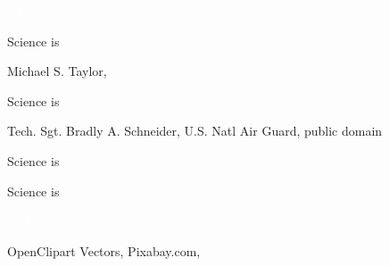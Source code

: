 \documentclass[t]{beamer}
\begin{document}

{
\begin{frame}[b]

	\hfill \tiny\textcolor{white}{J.J, }
\end{frame}
}
%
{
\begin{frame}[b]{Science is }

\tiny Michael S. Taylor, 
\end{frame}
}

{
\begin{frame}[b]{Science is }

\tiny Tech. Sgt. Bradly A. Schneider, U.S. Natl Air Guard, public domain

\end{frame}
}
%

{
	\begin{frame}[b]{Science is }
\end{frame}
}
%

{
\begin{frame}[b]{Science is }
\end{frame}
}
%
{
\begin{frame}[b]

\hfill \tiny \textcolor{white}{decltype, }
\end{frame}
}

{
\begin{frame}[b,plain]

\hfill\tiny OpenClipart Vectors, Pixabay.com, 
\end{frame}
}

%
%	
%	
%
\end{document}
